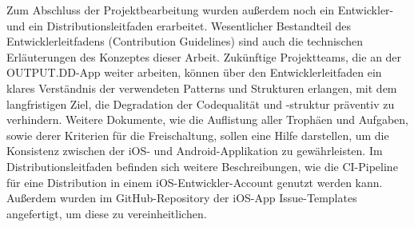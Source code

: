 Zum Abschluss der Projektbearbeitung wurden außerdem noch ein Entwickler- und ein Distributionsleitfaden erarbeitet. Wesentlicher Bestandteil des Entwicklerleitfadens (Contribution Guidelines) sind auch die technischen Erläuterungen des Konzeptes dieser Arbeit. Zukünftige Projektteams, die an der OUTPUT.DD-App weiter arbeiten, können über den Entwicklerleitfaden ein klares Verständnis der verwendeten Patterns und Strukturen erlangen, mit dem langfristigen Ziel, die Degradation der Codequalität und -struktur präventiv zu verhindern. Weitere Dokumente, wie die Auflistung aller Trophäen und Aufgaben, sowie derer Kriterien für die Freischaltung, sollen eine Hilfe darstellen, um die Konsistenz zwischen der iOS- und Android-Applikation zu gewährleisten. Im Distributionsleitfaden befinden sich weitere Beschreibungen, wie die CI-Pipeline für eine Distribution in einem iOS-Entwickler-Account genutzt werden kann. Außerdem wurden im GitHub-Repository der iOS-App Issue-Templates angefertigt, um diese zu vereinheitlichen.
